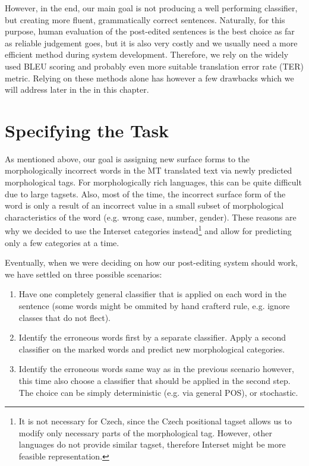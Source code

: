 However, in the end, our main goal is not producing a well performing classifier, but creating
more fluent, grammatically correct sentences.
Naturally, for this purpose, human evaluation of the post-edited sentences is the best choice as far
as reliable judgement goes, but it is also very costly and we usually need a more efficient
method during system development. Therefore, we rely on the widely used BLEU scoring and
probably even more suitable translation error rate (TER) metric. Relying on these methods alone
has however a few drawbacks which we will address later in the in this chapter.

\section{Specifying the Task}

As mentioned above, our goal is assigning new surface forms to the morphologically incorrect words
in the MT translated text via newly predicted morphological tags. For morphologically rich languages,
this can be quite difficult due to large tagsets. Also, most of the time,
the incorrect surface form of the word is only a result of an incorrect value in a small
subset of morphological characteristics of the word (e.g. wrong case, number, gender).
These reasons are why we decided to use the Interset categories instead\footnote{It is
not necessary for Czech, since the Czech positional tagset allows us to modify only necessary
parts of the morphological tag. However, other languages do not provide similar tagset, therefore
Interset might be more feasible representation.} and allow for predicting only a few categories at a time.

Eventually, when we were deciding on how our post-editing system should work, we have settled on three possible scenarios:
\begin{enumerate}
    \item Have one completely general classifier that is applied on each word in the sentence (some
        words might be ommited by hand crafterd rule, e.g. ignore classes that do not flect).
    \item Identify the erroneous words first by a separate classifier. Apply a second classifier
        on the marked words and predict new morphological categories.
    \item Identify the erroneous words same way as in the previous scenario however, this time also choose a classifier that
        should be applied in the second step. The choice can be simply deterministic (e.g. via general POS), or stochastic.
\end{enumerate}

